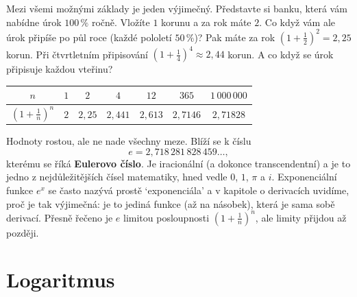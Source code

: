 Mezi všemi možnými základy je jeden výjimečný. Představte si banku, která vám nabídne úrok $100\,\%$ ročně. Vložíte $1$ korunu a za rok máte $2$. Co když vám ale úrok připíše po půl roce (každé pololetí $50\,\%$)? Pak máte za rok ${(1 + \frac{1}{2})}^2 = 2{,}25$ korun. Při čtvrtletním připisování ${(1 + \frac{1}{4})}^4\approx 2{,}44$ korun. A co když se úrok připisuje každou vteřinu?
\begin{center}
  \renewcommand{\arraystretch}{1.3}
  \begin{tabular}{|c|c|c|c|c|c|c|}
    \hline
    $n$ & $1$ & $2$ & $4$ & $12$ & $365$ & $1\,000\,000$ \\
    \hline
    ${\left(1 + \frac{1}{n}\right)}^n$ & $2$ & $2{,}25$ & $2{,}441$ & $2{,}613$ & $2{,}7146$ & $2{,}71828$ \\
    \hline
  \end{tabular}
\end{center}
Hodnoty rostou, ale ne nade všechny meze. Blíží se k číslu
\begin{equation*}
  e = 2{,}718\,281\,828\,459\ldots,
\end{equation*}
kterému se říká \textbf{Eulerovo číslo}. Je iracionální (a dokonce transcendentní) a je to jedno z nejdůležitějších čísel matematiky, hned vedle $0$, $1$, $\pi$ a $i$. Exponenciální funkce $e^x$ se často nazývá prostě `exponenciála' a v kapitole o derivacích uvidíme, proč je tak výjimečná: je to jediná funkce (až na násobek), která je sama sobě derivací. Přesně řečeno je $e$ limitou posloupnosti ${\left(1 + \frac{1}{n}\right)}^n$, ale limity přijdou až později.

\begin{center}
\end{center}

\section{Logaritmus}\label{sec:logaritmus}

